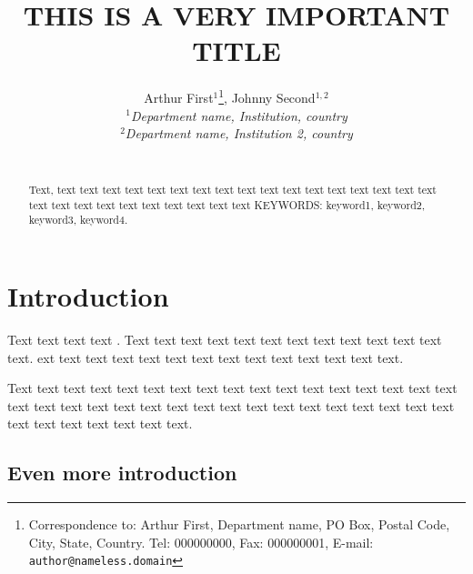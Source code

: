 \documentclass[12pt,a4paper]{article}
\begin{document}
\title{THIS IS A VERY IMPORTANT TITLE}

\author{Arthur First$^{1}$\thanks{Correspondence to: Arthur First, Department name, PO Box, Postal Code, City, State, Country. Tel: 000000000, Fax: 000000001, E-mail: \texttt{author@nameless.domain}}, Johnny Second$^{1,2}$\\
\small{\textsl{$^1$Department name, Institution, country}}\\
\small{\textsl{$^2$Department name, Institution 2, country}}\\
\newline\\
\date{}}
\maketitle
\thispagestyle{empty}

\newpage
\setcounter{page}{1}
\begin{abstract}
Text, text text text text text text text text text text text text text text text text text text text text text text text text text text text
\noindent KEYWORDS: keyword1, keyword2, keyword3, keyword4.
\end{abstract}

\section{Introduction}
\label{s:intro}
Text text text text \citep{Little1987}. Text text text text text text text text text text \citet{Scott1950} text text text. ext text text text text text text text text text text text text text\citep{AgrestiA2002,Boggs1982,Cowan1980,Rubin2009,Scott1950,WarnerSL1965}. 

Text text text text text text text text text text text text text text text text text text text text text text text text text text text \citet{AgrestiA2002,Boggs1982,Cowan1980} text text text text text text text text text text text text text text.

\subsection{Even more introduction}
\label{s:subintro}

  
  
\end{document}
